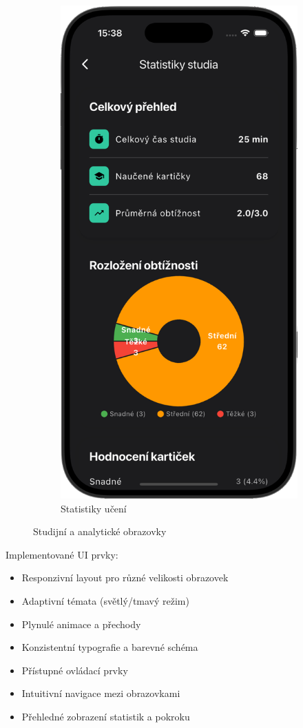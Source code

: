 \documentclass[12pt, a4paper, oneside]{report}
\begin{document}
\begin{figure}[h]
\begin{subfigure}[b]{0.48\textwidth}
			\includegraphics[width=0.75\linewidth]{../image/screen-statistics.png}
			\caption{Statistiky učení}
			\label{fig:screen-stats}
		\end{subfigure}
		\caption{Studijní a analytické obrazovky}
		\label{fig:study-screens}
	\end{figure}

	Implementované UI prvky:
	\begin{itemize}
		\item Responzivní layout pro různé velikosti obrazovek
		\item Adaptivní témata (světlý/tmavý režim)
		\item Plynulé animace a přechody
		\item Konzistentní typografie a barevné schéma
		\item Přístupné ovládací prvky
		\item Intuitivní navigace mezi obrazovkami
		\item Přehledné zobrazení statistik a pokroku
	\end{itemize}
\end{document}
